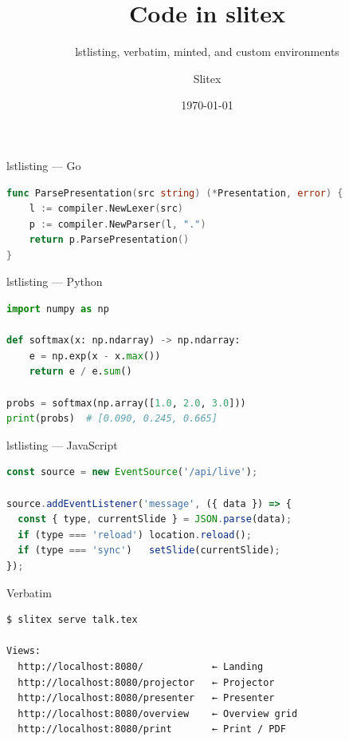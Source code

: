 \documentclass[aspectratio=169]{beamer}
\title{Code in slitex}
\subtitle{lstlisting, verbatim, minted, and custom environments}
\author{Slitex}
\date{\today}
\begin{document}
\begin{frame}
  \titlepage
\end{frame}


\begin{frame}[fragile]{lstlisting — Go}
  \begin{lstlisting}[language=Go]
func ParsePresentation(src string) (*Presentation, error) {
    l := compiler.NewLexer(src)
    p := compiler.NewParser(l, ".")
    return p.ParsePresentation()
}
  \end{lstlisting}
\end{frame}

\begin{frame}[fragile]{lstlisting — Python}
  \begin{lstlisting}[language=Python]
import numpy as np

def softmax(x: np.ndarray) -> np.ndarray:
    e = np.exp(x - x.max())
    return e / e.sum()

probs = softmax(np.array([1.0, 2.0, 3.0]))
print(probs)  # [0.090, 0.245, 0.665]
  \end{lstlisting}
\end{frame}

\begin{frame}[fragile]{lstlisting --- JavaScript}
  \begin{lstlisting}[language=JavaScript]
const source = new EventSource('/api/live');

source.addEventListener('message', ({ data }) => {
  const { type, currentSlide } = JSON.parse(data);
  if (type === 'reload') location.reload();
  if (type === 'sync')   setSlide(currentSlide);
});
  \end{lstlisting}
\end{frame}


\begin{frame}[fragile]{Verbatim}
  \begin{verbatim}
$ slitex serve talk.tex

Views:
  http://localhost:8080/            ← Landing
  http://localhost:8080/projector   ← Projector
  http://localhost:8080/presenter   ← Presenter
  http://localhost:8080/overview    ← Overview grid
  http://localhost:8080/print       ← Print / PDF
  \end{verbatim}
\end{frame}
\end{document}
